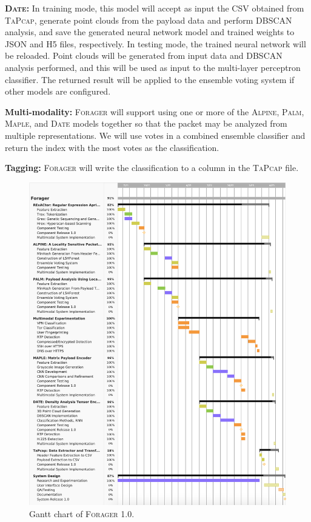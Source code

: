 \textbf{\textsc{Date}: } In training mode, this model will accept as input the CSV obtained from \textsc{TaPcap}, generate point clouds from the payload data and perform DBSCAN analysis, and save the generated neural network model and trained weights to JSON and H5 files, respectively. In testing mode, the trained neural network will be reloaded. Point clouds will be generated from input data and DBSCAN analysis performed, and this will be used as input to the multi-layer perceptron classifier. The returned result will be applied to the ensemble voting system if other models are configured.

\textbf{Multi-modality: } \textsc{Forager} will support using one or more of the \textsc{Alpine}, \textsc{Palm}, \textsc{Maple}, and \textsc{Date} models together so that the packet may be analyzed from multiple representations. We will use votes in a combined ensemble classifier and return the index with the most votes as the classification.

\textbf{Tagging: } \textsc{Forager} will write the classification to a column in the \textsc{TaPcap} file.

\begin{figure}
\includegraphics[width=\textwidth,height=\textheight]{chapters/expected/img/gantt.png}
\caption{Gantt chart of \textsc{Forager} 1.0.}
\label{fig:gantt}
\end{figure}
